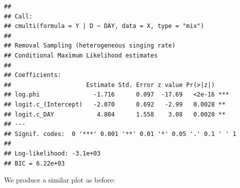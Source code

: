 \documentclass[12pt,]{book}
\newenvironment{Shaded}{\begin{snugshade}}{\end{snugshade}}
\newcommand{\ControlFlowTok}[1]{\textcolor[rgb]{0.13,0.29,0.53}{\textbf{#1}}}
\newcommand{\DataTypeTok}[1]{\textcolor[rgb]{0.13,0.29,0.53}{#1}}
\newcommand{\DecValTok}[1]{\textcolor[rgb]{0.00,0.00,0.81}{#1}}
\newcommand{\KeywordTok}[1]{\textcolor[rgb]{0.13,0.29,0.53}{\textbf{#1}}}
\newcommand{\NormalTok}[1]{#1}
\newcommand{\OperatorTok}[1]{\textcolor[rgb]{0.81,0.36,0.00}{\textbf{#1}}}
\newcommand{\StringTok}[1]{\textcolor[rgb]{0.31,0.60,0.02}{#1}}
\begin{document}
\begin{verbatim}
## 
## Call:
## cmulti(formula = Y | D ~ DAY, data = X, type = "mix")
## 
## Removal Sampling (heterogeneous singing rate)
## Conditional Maximum Likelihood estimates
## 
## Coefficients:
##                     Estimate Std. Error z value Pr(>|z|)    
## log.phi               -1.716      0.097  -17.69   <2e-16 ***
## logit.c_(Intercept)   -2.070      0.692   -2.99   0.0028 ** 
## logit.c_DAY            4.804      1.558    3.08   0.0020 ** 
## ---
## Signif. codes:  0 '***' 0.001 '**' 0.01 '*' 0.05 '.' 0.1 ' ' 1 
## 
## Log-likelihood: -3.1e+03 
## BIC = 6.22e+03
\end{verbatim}

We produce a similar plot as before:

\begin{Shaded}
\end{Shaded}
\end{document}
